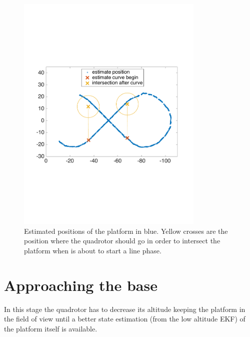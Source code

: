 \begin{figure}[!htbp]
    \centering
    \includegraphics[width=0.8\textwidth]{img/following_platform_normal_map_intersection.pdf}
    \caption{Estimated positions of the platform in blue.  Yellow crosses are the position where the quadrotor should go in order to intersect the platform when is about to start a line phase.}
    \label{fig:map_intersections}
\end{figure}

\section{Approaching the base}
In this stage the quadrotor has to decrease its altitude keeping the platform in the field of view until a better state estimation (from the low altitude EKF) of the platform itself is available.\\

